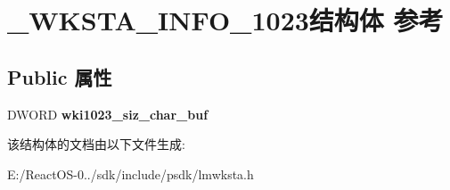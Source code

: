 \hypertarget{struct___w_k_s_t_a___i_n_f_o__1023}{}\section{\+\_\+\+W\+K\+S\+T\+A\+\_\+\+I\+N\+F\+O\+\_\+1023结构体 参考}
\label{struct___w_k_s_t_a___i_n_f_o__1023}
\subsection*{Public 属性}
\begin{DoxyCompactItemize}
\item 
\mbox{\label{struct___w_k_s_t_a___i_n_f_o__1023_ad6b62a43088bfc0847c1fa1aea3528c8}} 
D\+W\+O\+RD {\bfseries wki1023\+\_\+siz\+\_\+char\+\_\+buf}
\end{DoxyCompactItemize}


该结构体的文档由以下文件生成\+:\begin{DoxyCompactItemize}
\item 
E\+:/\+React\+O\+S-\/0../sdk/include/psdk/lmwksta.\+h\end{DoxyCompactItemize}
